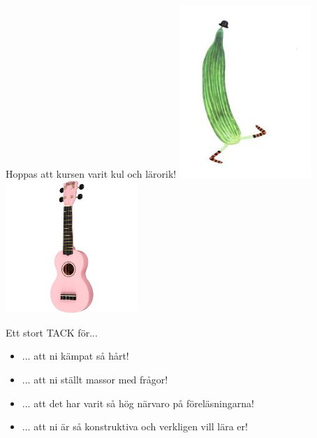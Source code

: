 \begin{Slide}{Hoppas att kursen varit kul och lärorik!}
\includegraphics[width=5cm]{../img/gurka.jpg}\includegraphics[width=5cm]{../img/ukulele.jpg}
\end{Slide}

\begin{Slide}{Ett stort TACK för...}
\begin{itemize}
\item ... att ni kämpat så hårt!
\item ... att ni ställt massor med frågor!
\item ... att det har varit så hög närvaro på föreläsningarna!
\item ... att ni är så konstruktiva och verkligen vill lära er!
\end{itemize}
\vspace{2em} \pause

\end{Slide}



\fi
